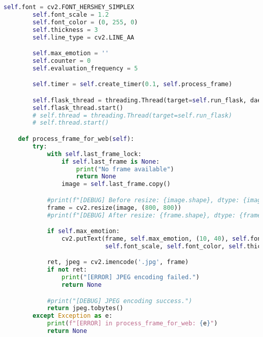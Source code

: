 \begin{lstlisting}[language=Python, caption={Python skript pre rozpoznávanie emócií}, label={lst:emotion-recognition}]
        self.font = cv2.FONT_HERSHEY_SIMPLEX
        self.font_scale = 1.2
        self.font_color = (0, 255, 0)
        self.thickness = 3
        self.line_type = cv2.LINE_AA

        self.max_emotion = ''
        self.counter = 0
        self.evaluation_frequency = 5

        self.timer = self.create_timer(0.1, self.process_frame)

        self.flask_thread = threading.Thread(target=self.run_flask, daemon=True)
        self.flask_thread.start()
        # self.thread = threading.Thread(target=self.run_flask)
        # self.thread.start()

    def process_frame_for_web(self):
        try:
            with self.last_frame_lock:
                if self.last_frame is None:
                    print("No frame available")
                    return None
                image = self.last_frame.copy()

            #print(f"[DEBUG] Before resize: {image.shape}, dtype: {image.dtype}")
            frame = cv2.resize(image, (800, 800))
            #print(f"[DEBUG] After resize: {frame.shape}, dtype: {frame.dtype}")

            if self.max_emotion:
                cv2.putText(frame, self.max_emotion, (10, 40), self.font,
                            self.font_scale, self.font_color, self.thickness, self.line_type)

            ret, jpeg = cv2.imencode('.jpg', frame)
            if not ret:
                print("[ERROR] JPEG encoding failed.")
                return None

            #print("[DEBUG] JPEG encoding success.")
            return jpeg.tobytes()
        except Exception as e:
            print(f"[ERROR] in process_frame_for_web: {e}")
            return None






\end{lstlisting}
